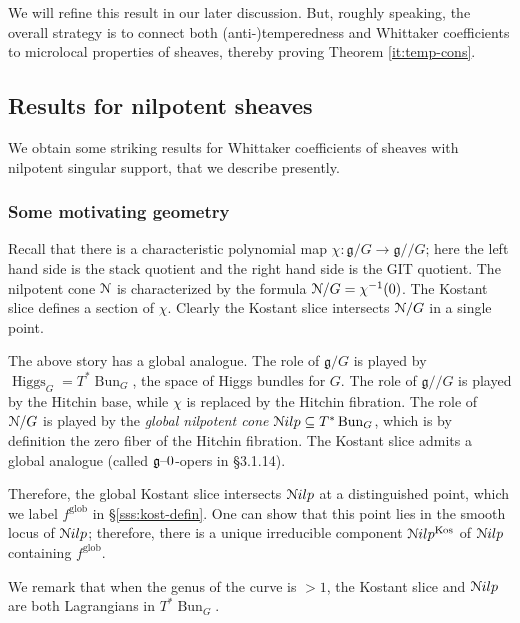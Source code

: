 \documentclass[reqno,11pt]{amsart}
\numberwithin{equation}{subsection}
\theoremstyle{remark}
\newcommand{\sN}{{\EuScript N}}
\newcommand{\fg}{{\mathfrak g}}
\newcommand{\on}{\operatorname}
\newcommand{\mathendash}{\text{\textendash}}
\newcommand{\Bun}{\on{Bun}}
\renewcommand{\subset}{\subseteq}
\newcommand{\Nilp}{\sN ilp}
\newcommand{\Higgs}{\on{Higgs}}
\newcommand{\Kos}{\on{Kos}}
\begin{document}
We will refine this result in our later discussion. But, roughly speaking,
the overall strategy is to connect both (anti-)temperedness and Whittaker
coefficients to microlocal properties of sheaves, thereby proving 
Theorem \ref{it:temp-cons}.

\subsection{Results for nilpotent sheaves}

We obtain some striking results for Whittaker coefficients
of sheaves with nilpotent singular support, that we 
describe presently.  

\subsubsection{Some motivating geometry}

Recall that there is a characteristic polynomial map $\chi:\fg/G \to \fg//G$;
here the left hand side is the stack quotient and the right hand
side is the GIT quotient. The nilpotent cone $\sN$ is characterized
by the formula $\sN/G = \chi^{-1}(0)$.
The Kostant slice defines a section of $\chi$. Clearly the Kostant slice
intersects $\sN/G$ in a single point.

The above story has a global analogue. The role of $\fg/G$ is played
by $\Higgs_G = T^*\Bun_G$, the space of Higgs bundles for $G$.
The role of $\fg//G$ is played by the Hitchin base, while $\chi$ is
replaced by the Hitchin fibration.
The role of $\sN/G$ is played by the \emph{global nilpotent cone} 
$\Nilp \subset T^*\Bun_G$, which is by definition the zero fiber
of the Hitchin fibration. The Kostant slice admits a global analogue
(called $\fg\mathendash 0$-opers in \cite{hitchin} \S 3.1.14).

Therefore, the global Kostant slice intersects
$\Nilp$ at a distinguished point, which we label
$f^{\on{glob}}$ in \S \ref{sss:kost-defin}.
One can show that this point lies in the smooth
locus of $\Nilp$; therefore, there is a unique irreducible 
component $\Nilp^{\Kos}$ of $\Nilp$ containing $f^{\on{glob}}$.

We remark that when the genus of the curve is $>1$, 
the Kostant slice and $\Nilp$ are both Lagrangians in $T^*\Bun_G$.

\subsubsection{}
\end{document}
